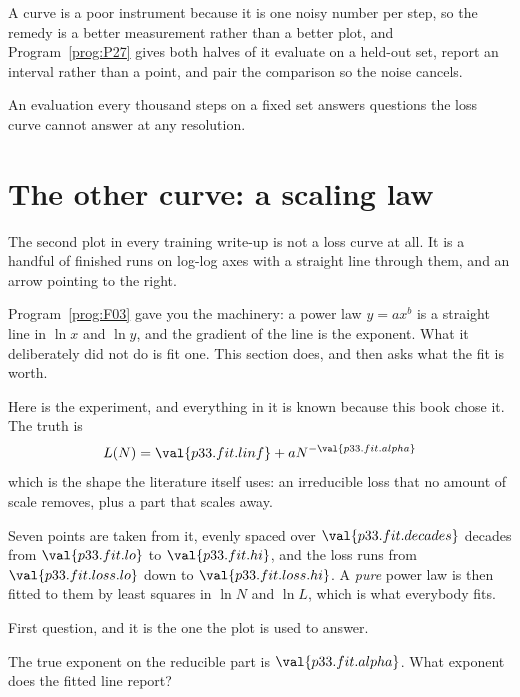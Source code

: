 \begin{fr}
\begin{aibox}
A curve is a poor instrument because it is one noisy number per step, so the
remedy is a better measurement rather than a better plot, and Program~\ref{prog:P27} gives both halves of it
\dash{} evaluate on a held-out set, report an interval rather than a point,
and pair the comparison so the noise cancels.

An evaluation every thousand steps on a fixed set answers questions the
loss curve cannot answer at any resolution.
\end{aibox}
\end{fr}

\section{The other curve: a scaling law}
\label{sec:P33-scaling}

\begin{fr}
The second plot in every training write-up is not a loss curve at all. It is
a handful of finished runs on log-log axes with a straight line through them,
and an arrow pointing to the right.

Program~\ref{prog:F03} gave you the machinery: a power law $y = ax^{b}$ is a
straight line in $\ln x$ and $\ln y$, and the gradient of the line is the
exponent. What it deliberately did not do is fit one. This section does, and
then asks what the fit is worth.
\end{fr}

\begin{fr}
Here is the experiment, and everything in it is known because this book chose
it. The truth is
\[ L(N) = \val{p33.fit.linf} + a N^{-\val{p33.fit.alpha}} \]
which is the shape the literature itself uses: an irreducible loss that no
amount of scale removes, plus a part that scales away.

Seven points are taken from it, evenly spaced over
$\val{p33.fit.decades}$ decades from $\val{p33.fit.lo}$ to
$\val{p33.fit.hi}$, and the loss runs from $\val{p33.fit.loss.lo}$ down to
$\val{p33.fit.loss.hi}$. A \emph{pure} power law is then fitted to them by
least squares in $\ln N$ and $\ln L$, which is what everybody fits.
\end{fr}

\begin{fr}
First question, and it is the one the plot is used to answer.

The true exponent on the reducible part is $\val{p33.fit.alpha}$. What
exponent does the fitted line report?
\dotline
\nextframe
\end{fr}

